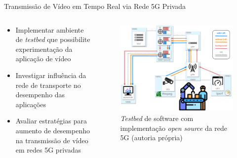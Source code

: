 \begin{frame}{Transmissão de Vídeo em Tempo Real via Rede 5G Privada}
    \begin{columns}
        \begin{column}{0.45\textwidth}
            \begin{itemize}
                \item Implementar ambiente de \textit{testbed} que possibilite experimentação da aplicação de vídeo
                \item Investigar influência da rede de transporte no desempenho das aplicações
                \item Avaliar estratégias para aumento de desempenho na transmissão de vídeo em redes 5G privadas
            \end{itemize}
        \end{column}
        \begin{column}{0.55\textwidth}
            \begin{figure}[htb]
                \centering
                \includegraphics[width=\textwidth]{figs/testbed_5G_privado.pdf}
                \caption{\textit{Testbed} de software com implementação \textit{open source} da rede 5G (autoria própria)}
                \label{fig:setup}
            \end{figure} 
        \end{column}
    \end{columns}
\end{frame}